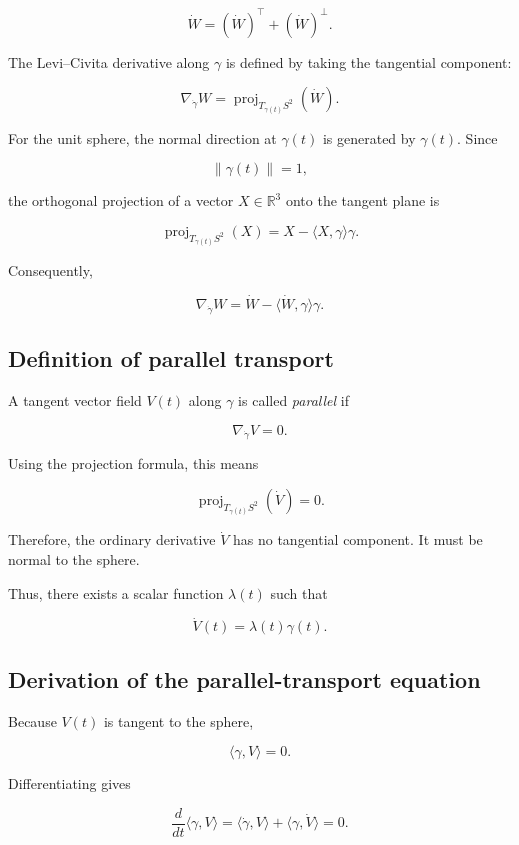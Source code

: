 \documentclass[12pt,a4paper]{article}
\theoremstyle{notespace}
\begin{document}
\[
\dot W
=
\left(\dot W\right)^{\top}
+
\left(\dot W\right)^{\perp}.
\]

The Levi--Civita derivative along \(\gamma\) is defined by taking the
tangential component:

\[
\boxed{
	\nabla_{\dot\gamma}W
	=
	\operatorname{proj}_{T_{\gamma(t)}S^2}
	\left(\dot W\right).
}
\]

For the unit sphere, the normal direction at \(\gamma(t)\) is generated
by \(\gamma(t)\). Since

\[
\|\gamma(t)\|=1,
\]

the orthogonal projection of a vector \(X\in\mathbb{R}^3\) onto the
tangent plane is

\[
\operatorname{proj}_{T_{\gamma(t)}S^2}(X)
=
X-\langle X,\gamma\rangle\gamma.
\]

Consequently,

\[
\boxed{
	\nabla_{\dot\gamma}W
	=
	\dot W-\langle\dot W,\gamma\rangle\gamma.
}
\]

\subsection{Definition of parallel transport}

A tangent vector field \(V(t)\) along \(\gamma\) is called
\emph{parallel} if

\[
\boxed{
	\nabla_{\dot\gamma}V=0.
}
\]

Using the projection formula, this means

\[
\operatorname{proj}_{T_{\gamma(t)}S^2}(\dot V)=0.
\]

Therefore, the ordinary derivative \(\dot V\) has no tangential
component. It must be normal to the sphere.

Thus, there exists a scalar function \(\lambda(t)\) such that

\[
\dot V(t)=\lambda(t)\gamma(t).
\]

\subsection{Derivation of the parallel-transport equation}

Because \(V(t)\) is tangent to the sphere,

\[
\langle\gamma,V\rangle=0.
\]

Differentiating gives

\[
\frac{d}{dt}\langle\gamma,V\rangle
=
\langle\dot\gamma,V\rangle
+
\langle\gamma,\dot V\rangle
=
0.
\]
\end{document}
